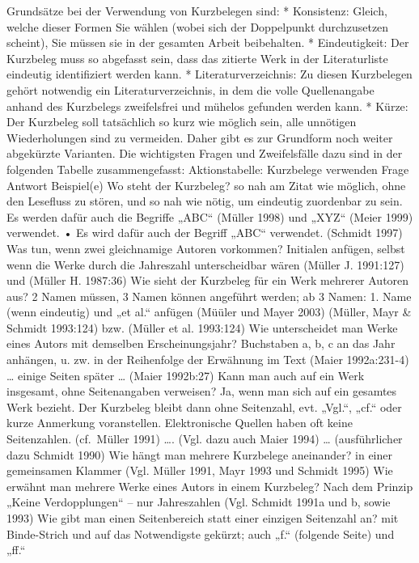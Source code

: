 \documentclass[]{book}
\theoremstyle{definition}
\theoremstyle{definition}
\theoremstyle{definition}
\theoremstyle{remark}
\begin{document}
Grundsätze bei der Verwendung von Kurzbelegen sind: * Konsistenz:
Gleich, welche dieser Formen Sie wählen (wobei sich der Doppelpunkt
durchzusetzen scheint), Sie müssen sie in der gesamten Arbeit
beibehalten. * Eindeutigkeit: Der Kurzbeleg muss so abgefasst sein, dass
das zitierte Werk in der Literaturliste eindeutig identifiziert werden
kann. * Literaturverzeichnis: Zu diesen Kurzbelegen gehört notwendig ein
Literaturverzeichnis, in dem die volle Quellenangabe anhand des
Kurzbelegs zweifelsfrei und mühelos gefunden werden kann. * Kürze: Der
Kurzbeleg soll tatsächlich so kurz wie möglich sein, alle unnötigen
Wiederholungen sind zu vermeiden. Daher gibt es zur Grundform noch
weiter abgekürzte Varianten. Die wichtigsten Fragen und Zweifelsfälle
dazu sind in der folgenden Tabelle zusammengefasst: Aktionstabelle:
Kurzbelege verwenden Frage Antwort Beispiel(e) Wo steht der Kurzbeleg?
so nah am Zitat wie möglich, ohne den Lesefluss zu stören, und so nah
wie nötig, um eindeutig zuordenbar zu sein. Es werden dafür auch die
Begriffe „ABC`` (Müller 1998) und „XYZ`` (Meier 1999) verwendet. • Es
wird dafür auch der Begriff „ABC`` verwendet. (Schmidt 1997) Was tun,
wenn zwei gleichnamige Autoren vorkommen? Initialen anfügen, selbst wenn
die Werke durch die Jahreszahl unterscheidbar wären (Müller J. 1991:127)
und (Müller H. 1987:36) Wie sieht der Kurzbeleg für ein Werk mehrerer
Autoren aus? 2 Namen müssen, 3 Namen können angeführt werden; ab 3
Namen: 1. Name (wenn eindeutig) und „et al.`` anfügen (Müüler und Mayer
2003) (Müller, Mayr \& Schmidt 1993:124) bzw. (Müller et al. 1993:124)
Wie unterscheidet man Werke eines Autors mit demselben Erscheinungsjahr?
Buchstaben a, b, c an das Jahr anhängen, u. zw. in der Reihenfolge der
Erwähnung im Text (Maier 1992a:231-4) \ldots{} einige Seiten später
\ldots{} (Maier 1992b:27) Kann man auch auf ein Werk insgesamt, ohne
Seitenangaben verweisen? Ja, wenn man sich auf ein gesamtes Werk
bezieht. Der Kurzbeleg bleibt dann ohne Seitenzahl, evt. „Vgl.``, „cf.``
oder kurze Anmerkung voranstellen. Elektronische Quellen haben oft keine
Seitenzahlen. (cf.~Müller 1991) \ldots{}. (Vgl. dazu auch Maier 1994)
\ldots{} (ausführlicher dazu Schmidt 1990) Wie hängt man mehrere
Kurzbelege aneinander? in einer gemeinsamen Klammer (Vgl. Müller 1991,
Mayr 1993 und Schmidt 1995) Wie erwähnt man mehrere Werke eines Autors
in einem Kurzbeleg? Nach dem Prinzip „Keine Verdopplungen`` -- nur
Jahreszahlen (Vgl. Schmidt 1991a und b, sowie 1993) Wie gibt man einen
Seitenbereich statt einer einzigen Seitenzahl an? mit Binde-Strich und
auf das Notwendigste gekürzt; auch „f.`` (folgende Seite) und „ff.``
\end{document}
